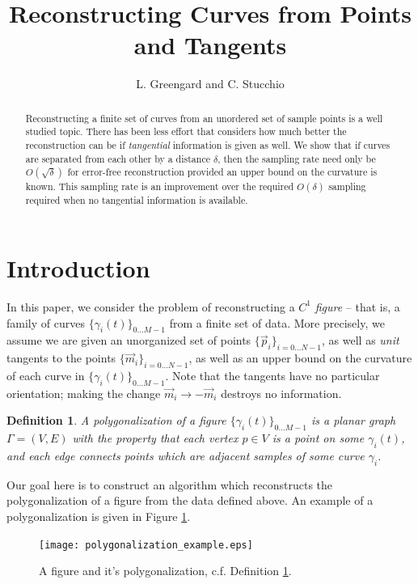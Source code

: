 \documentclass{article}
\newtheorem{definition}[cntr]{Definition}
\numberwithin{cntr}{section}
\numberwithin{equation}{section}
\newcommand{\vp}[0]{{\vec{p}}}
\newcommand{\vm}[0]{{\vec{m}}}
\newcommand{\Oto}[1]{{0 \ldots #1-1}}
\newcommand{\OtoN}{{0 \ldots N-1}}
\newcommand{\pointData}{{ \{ \vp_{i} \}_{i=\OtoN} }}
\newcommand{\tanData}{{ \{ \vm_{i} \}_{i=\OtoN} }}
\newcommand{\curveSet}{{ \{ \gamma_i(t) \}_{\Oto{M}}}}
\newcommand{\curvesep}{{\delta}}
\begin{document}
\title{Reconstructing Curves from Points and Tangents}

\author{L. Greengard and C. Stucchio}

\maketitle

\begin{abstract}
Reconstructing a finite set of curves from an unordered set of sample points
is a well studied topic. There has been less
effort that considers how much better the reconstruction can be if
\emph{tangential} information is given as well.
We show that if curves are separated from each other by a
distance $\curvesep$, then the sampling rate need only be $O(\sqrt{\curvesep})$
for error-free reconstruction provided an upper bound on the curvature is known. This sampling rate is an improvement over the required $O(\curvesep)$ sampling required when no tangential information is available.
\end{abstract}

\section{Introduction}

In this paper, we consider the problem of reconstructing a
$C^{1}$ \emph{figure} -- that is, a family of curves $\curveSet$ from a finite
set of data. More precisely, we assume we are given
an unorganized set of points $\pointData$, as well as \emph{unit} tangents to the points $\tanData$, as well as an upper bound on the curvature of each curve in $\curveSet$. Note that the tangents have no particular orientation; making the change $\vm_{i} \rightarrow -\vm_{i}$ destroys no information.

\begin{definition}
  \label{def:polygonalization}
  A polygonalization of a figure $\curveSet$ is a planar graph
$\Gamma = (V,E)$ with the property that each vertex $p \in V$ is a point on some $\gamma_{i}(t)$, and each edge connects points which are adjacent samples of some curve $\gamma_{i}$.
\end{definition}

Our goal here is to construct an algorithm which reconstructs the
polygonalization of a figure from the data defined above.
An example of a polygonalization is given in Figure \ref{fig:polygonalization}.

\begin{figure}
\setlength{\unitlength}{0.240900pt}
\ifx\plotpoint\undefined\newsavebox{\plotpoint}\fi
\sbox{\plotpoint}{\rule[-0.200pt]{0.400pt}{0.400pt}}%
\texttt{[image: polygonalization\_example.eps]}
\caption{A figure and it's polygonalization, c.f. Definition \ref{def:polygonalization}. }
\label{fig:polygonalization}
\end{figure}
\end{document}

